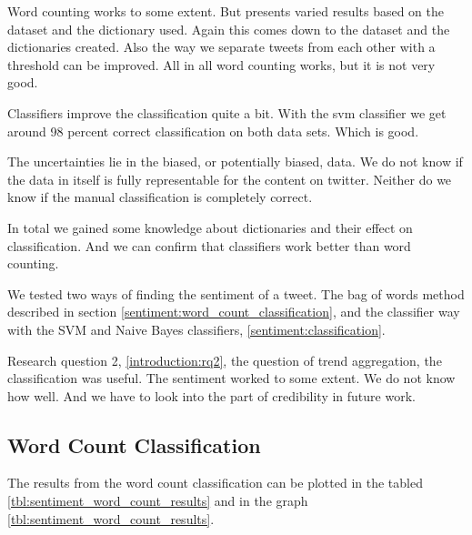 Word counting works to some extent. But presents varied results based on the
dataset and the dictionary used. Again this comes down to the dataset and the
dictionaries created. Also the way we separate tweets from each other with a
threshold can be improved. All in all word counting works, but it is not very
good. 

Classifiers  improve the classification quite a bit. With the svm classifier we
get around 98 percent correct classification on both data sets. Which is good.

The uncertainties lie in the biased, or potentially biased, data. We do not
know if the data in itself is fully representable for the content on twitter.
Neither do we know if the manual classification is completely correct. 

In total we gained some knowledge about dictionaries and their effect on
classification. And we can confirm that classifiers work better than word
counting.  

We tested two ways of finding the sentiment of a tweet. The bag of words method
described in section \ref{sentiment:word_count_classification}, and the
classifier way with the SVM and Naive Bayes classifiers,
\ref{sentiment:classification}.

Research question 2, \ref{introduction:rq2}, the question of trend aggregation,
the classification was useful. The sentiment worked to some extent. We do not
know how well. And we have to look into the part of credibility in future work.   
%

\subsection{Word Count Classification}\label{results:word_count_classification}
The results from the word count classification can be plotted in the tabled
\ref{tbl:sentiment_word_count_results} and in the graph
\ref{tbl:sentiment_word_count_results}.

